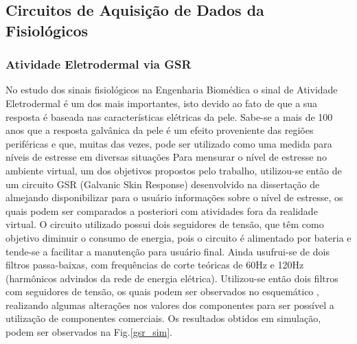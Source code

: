     

\subsection{Circuitos de Aquisição de Dados da Fisiológicos}

\subsubsection{Atividade Eletrodermal via GSR}
No estudo dos sinais fisiológicos na Engenharia Biomédica o sinal de Atividade Eletrodermal é um dos mais importantes, isto devido ao fato de que a sua resposta é baseada nas características elétricas da pele. Sabe-se a mais de 100 anos %
que a resposta galvânica da pele é um efeito proveniente das regiões periféricas e que, muitas das vezes, pode ser utilizado como uma medida para níveis de estresse em diversas situações %
	Para mensurar o nível de estresse no ambiente virtual, um dos objetivos propostos pelo trabalho, utilizou-se então de um circuito GSR (Galvanic Skin Response) desenvolvido na dissertação de %
almejando disponibilizar para o usuário informações sobre o nível de estresse, os quais podem ser comparados a posteriori com atividades fora da realidade virtual.
	O circuito utilizado possui dois seguidores de tensão, que têm como objetivo diminuir o consumo de energia, pois o circuito é alimentado por bateria e tende-se a facilitar a manutenção para usuário final. Ainda usufrui-se de dois filtros passa-baixas, com frequências de corte teóricas de 60Hz e 120Hz (harmônicos advindos da rede de energia elétrica). Utilizou-se então dois filtros com seguidores de tensão, os quais podem ser observados no esquemático %
, realizando algumas alterações nos valores dos componentes para ser possível a utilização de componentes comerciais.
	Os resultados obtidos em simulação, podem ser observados na Fig.\ref{gsr_sim}.
    
